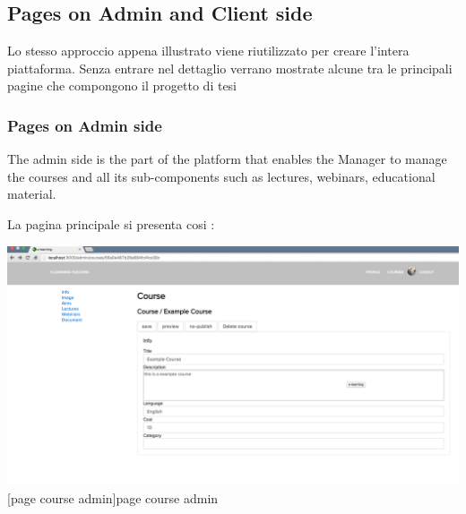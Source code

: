 




\subsection {Pages on Admin and Client side}
\label{subsec:pages}
Lo stesso approccio appena illustrato viene riutilizzato per creare l'intera piattaforma.
Senza entrare nel dettaglio verrano mostrate alcune tra le principali pagine che compongono il progetto di tesi

\subsubsection {Pages on Admin side}
\label{subsec:Admin_side}


The admin side is the part of the platform that enables the Manager to manage the courses and all its sub-components such as lectures, webinars, educational material.

La pagina principale si presenta cosi :

\begin{minipage}{\linewidth}
    \centering
    \includegraphics[width=1.0\linewidth]{images/chapter4/page-course-admin.png}
    [page course admin]{page course admin}
\end{minipage}


